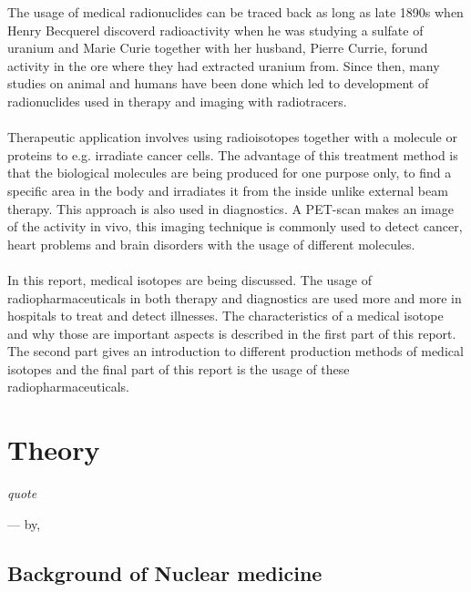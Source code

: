 \documentclass[twoside,english]{uiofysmaster/uiofysmaster}
\begin{document}
\noindent
The usage of medical radionuclides can be traced back as long as late 1890s when Henry Becquerel discoverd radioactivity when he was studying a sulfate of uranium and Marie Curie together with her husband, Pierre Currie, forund activity in the ore where they had extracted uranium from. Since then, many studies on animal and humans have been done which led to development of radionuclides used in therapy and imaging with radiotracers.
\\ 
\\
Therapeutic application involves using radioisotopes together with a molecule or proteins to e.g. irradiate cancer cells. The advantage of this treatment method is that the biological molecules are being produced for one purpose only, to find a specific area in the body and irradiates it from the inside unlike external beam therapy. This approach is also used in diagnostics. A PET-scan makes an image of the activity in vivo, this imaging technique is commonly used to detect cancer, heart problems and brain disorders with the usage of different molecules.
\\
\\
In this report, medical isotopes are being discussed. The usage of radiopharmaceuticals in both therapy and diagnostics are used more and more in hospitals to treat and detect illnesses. The characteristics of a medical isotope and why those are important aspects is described in the first part of this report. The second part gives an introduction to different production methods of medical isotopes and the final part of this report is the usage of these radiopharmaceuticals.  
\\



\chapter{Theory}
\label{ch: beyond}

\epigraph{\itshape quote}{--- \textup{by}, }
 


\section{Background of Nuclear medicine}
\label{sec:Background}
\end{document}
